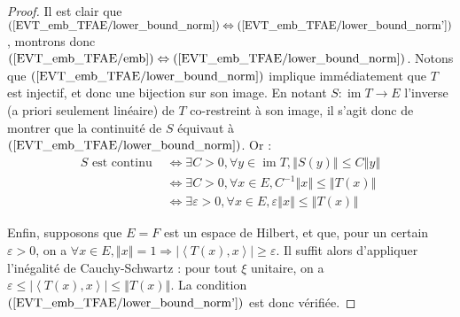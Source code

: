 \documentclass[a4paper,12pt]{article}
\newcommand{\N}{\mathbb{N}}
\newcommand{\norm}[1]{\left\Vert #1\right\Vert}
\newcommand{\abs}[1]{\left\vert#1\right\vert}
\newcommand{\ket}[1]{\left\langle #1 \right\rangle}
\newcommand{\inv}{^{-1}}
\newcommand{\comp}{\circ}
\renewcommand{\implies}{\Rightarrow}
\renewcommand{\iff}{\Leftrightarrow}
\DeclareMathOperator{\Ima}{im}
\begin{document}
\begin{proof}
    Il est clair que $(\ref{EVT_emb_TFAE/lower_bound_norm}) \iff(\ref{EVT_emb_TFAE/lower_bound_norm'})$, montrons donc $(\ref{EVT_emb_TFAE/emb}) \iff(\ref{EVT_emb_TFAE/lower_bound_norm})$. Notons que $(\ref{EVT_emb_TFAE/lower_bound_norm})$ implique
    immédiatement que $T$ est injectif, et donc une bijection sur son image. En notant $S:\Ima T\to E$ l'inverse (a priori seulement linéaire) de $T$ co-restreint à son image, 
    il s'agit donc de montrer que la continuité de $S$ équivaut à $(\ref{EVT_emb_TFAE/lower_bound_norm})$. Or :
    \begin{align*}
        S\text{ est continu }
            &\iff \exists C>0, \forall y\in\Ima T, \norm{S(y)} \le C\norm{y} \\
            &\iff \exists C>0, \forall x\in E, C\inv\norm{x} \le \norm{T(x)} \\
            &\iff \exists\varepsilon>0, \forall x\in E, \varepsilon\norm{x} \le \norm{T(x)}
    \end{align*}

    Enfin, supposons que $E=F$ est un espace de Hilbert, et que, pour un certain $\varepsilon>0$, on a $\forall x\in E, \norm{x} = 1 \implies \abs{\ket{T(x), x}}\ge\varepsilon$.
    Il suffit alors d'appliquer l'inégalité de Cauchy-Schwartz : pour tout $\xi$ unitaire, on a $\varepsilon\le\abs{\ket{T(x), x}}\le\norm{T(x)}$. La condition $(\ref{EVT_emb_TFAE/lower_bound_norm'})$
    est donc vérifiée.
\end{proof}
\end{document}
